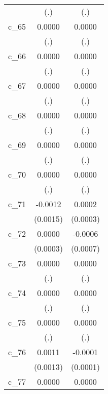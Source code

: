 {\begin{tabular}{l*{2}{c}}
            &         (.)        &         (.)        \\
[1em]
c\_65        &      0.0000        &      0.0000        \\
            &         (.)        &         (.)        \\
[1em]
c\_66        &      0.0000        &      0.0000        \\
            &         (.)        &         (.)        \\
[1em]
c\_67        &      0.0000        &      0.0000        \\
            &         (.)        &         (.)        \\
[1em]
c\_68        &      0.0000        &      0.0000        \\
            &         (.)        &         (.)        \\
[1em]
c\_69        &      0.0000        &      0.0000        \\
            &         (.)        &         (.)        \\
[1em]
c\_70        &      0.0000        &      0.0000        \\
            &         (.)        &         (.)        \\
[1em]
c\_71        &     -0.0012        &      0.0002        \\
            &    (0.0015)        &    (0.0003)        \\
[1em]
c\_72        &      0.0000        &     -0.0006        \\
            &    (0.0003)        &    (0.0007)        \\
[1em]
c\_73        &      0.0000        &      0.0000        \\
            &         (.)        &         (.)        \\
[1em]
c\_74        &      0.0000        &      0.0000        \\
            &         (.)        &         (.)        \\
[1em]
c\_75        &      0.0000        &      0.0000        \\
            &         (.)        &         (.)        \\
[1em]
c\_76        &      0.0011        &     -0.0001        \\
            &    (0.0013)        &    (0.0001)        \\
[1em]
c\_77        &      0.0000        &      0.0000        \\

\end{tabular}}
